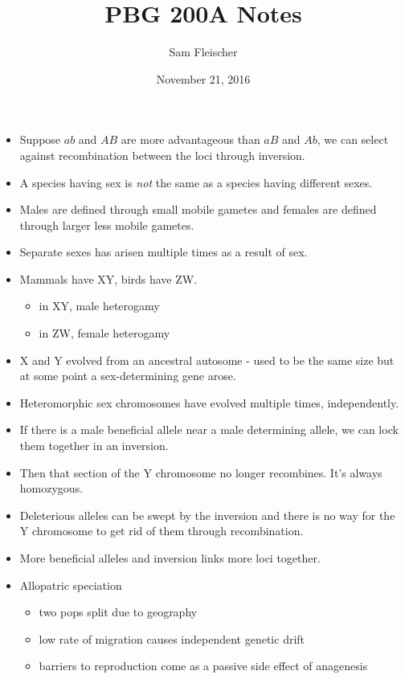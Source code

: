 \documentclass{article}
\title{PBG 200A Notes}
\author{Sam Fleischer}
\date{November 21, 2016}
\begin{document}
    \maketitle

    \begin{itemize}
        \item Suppose $ab$ and $AB$ are more advantageous than $aB$ and $Ab$, we can select against recombination between the loci through inversion.
        \item A species having sex is \emph{not} the same as a species having different sexes.
        \item Males are defined through small mobile gametes and females are defined through larger less mobile gametes.
        \item Separate sexes has arisen multiple times as a result of sex.
        \item Mammals have XY, birds have ZW.
        \begin{itemize}
            \item in XY, male heterogamy
            \item in ZW, female heterogamy
        \end{itemize}
        \item X and Y evolved from an ancestral autosome - used to be the same size but at some point a sex-determining gene arose.
        \item Heteromorphic sex chromosomes have evolved multiple times, independently.
        \item If there is a male beneficial allele near a male determining allele, we can lock them together in an inversion.
        \item Then that section of the Y chromosome no longer recombines.  It's always homozygous.
        \item Deleterious alleles can be swept by the inversion and there is no way for the Y chromosome to get rid of them through recombination.
        \item More beneficial alleles and inversion links more loci together.
        \item Allopatric speciation
        \begin{itemize}
            \item two pops split due to geography
            \item low rate of migration causes independent genetic drift
            \item barriers to reproduction come as a passive side effect of anagenesis

\end{itemize}
\end{itemize}
\end{document}
